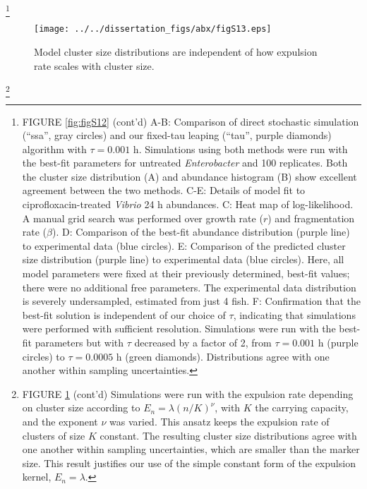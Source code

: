 {{{{{{{{\let\thefootnote\relax\footnote{FIGURE \ref{fig:figS12} (cont'd) A-B: Comparison of direct stochastic simulation (``ssa'', gray circles) and our fixed-tau leaping (``tau'', purple diamonds) algorithm with $\tau = 0.001$ h. Simulations using both methods were run with the best-fit parameters for untreated \textit{Enterobacter} and 100 replicates. Both the cluster size distribution (A) and abundance histogram (B) show excellent agreement between the two methods. C-E: Details of model fit to ciprofloxacin-treated \textit{Vibrio} 24 h abundances. C: Heat map of log-likelihood. A manual grid search was performed over growth rate ($r$) and fragmentation rate ($\beta$). D: Comparison of the best-fit abundance distribution (purple line) to experimental data (blue circles). E: Comparison of the predicted cluster size distribution (purple line) to experimental data (blue circles). Here, all model parameters were fixed at their previously determined, best-fit values; there were no additional free parameters. The experimental data distribution is severely undersampled, estimated from just 4 fish. F: Confirmation that the best-fit solution is independent of our choice of $\tau$, indicating that simulations were performed with sufficient resolution. Simulations were run with the best-fit parameters but with $\tau$ decreased by a factor of 2, from $\tau=0.001$ h (purple circles) to $\tau = 0.0005$ h (green diamonds). Distributions agree with one another within sampling uncertainties.}


\begin{figure}[H]
	\centerline{
		\texttt{[image: ../../dissertation\_figs/abx/figS13.eps]}} 
	\caption{Model cluster size distributions are independent of how expulsion rate scales with cluster size.}
	\label{fig:figS13}
\end{figure}

{\let\thefootnote\relax\footnote{FIGURE \ref{fig:figS13} (cont'd) Simulations were run with the expulsion rate depending on cluster size according to $E_n = \lambda (n/K)^{\nu}$, with $K$ the carrying capacity, and the exponent $\nu$ was varied. This ansatz keeps the expulsion rate of clusters of size $K$ constant. The resulting cluster size distributions agree with one another within sampling uncertainties, which are smaller than the marker size. This result justifies our use of the simple constant form of the expulsion kernel, $E_n = \lambda$.}

}}}}}}}}}
